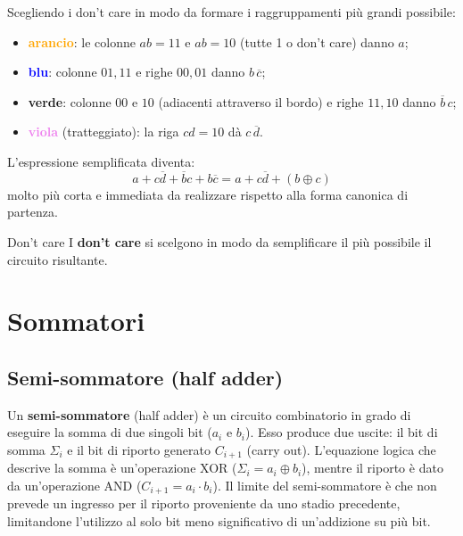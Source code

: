 \noindent Scegliendo i don't care in modo da formare i raggruppamenti più grandi possibile:
\begin{itemize}[leftmargin=1.5em, itemsep=1pt]
    \item \textcolor{orange}{\textbf{arancio}}: le colonne $ab=11$ e $ab=10$ (tutte 1 o don't care) danno $a$;
    \item \textcolor{blue}{\textbf{blu}}: colonne $01,11$ e righe $00,01$ danno $b\,\overline{c}$;
    \item \textcolor{green!60!black}{\textbf{verde}}: colonne $00$ e $10$ (adiacenti attraverso il bordo) e righe $11,10$ danno $\overline{b}\,c$;
    \item \textcolor{violet}{\textbf{viola}} (tratteggiato): la riga $cd=10$ dà $c\,\overline{d}$.
\end{itemize}
L'espressione semplificata diventa:
\[
a+c\overline{d}+\overline{b}c+b\overline{c} = a+c\overline{d}+(b\oplus c)
\]
molto più corta e immediata da realizzare rispetto alla forma canonica di partenza.

\begin{definizione}{Don't care}
I \textbf{don't care} si scelgono in modo da semplificare il più possibile il circuito risultante.
\end{definizione}

\section{Sommatori}

\subsection{Semi-sommatore (half adder)}

\noindent Un \textbf{semi-sommatore} (half adder) è un circuito combinatorio in grado di eseguire la somma di due singoli bit ($a_i$ e $b_i$). Esso produce due uscite: il bit di somma $\Sigma_i$ e il bit di riporto generato $C_{i+1}$ (carry out). L'equazione logica che descrive la somma è un'operazione XOR ($\Sigma_i = a_i \oplus b_i$), mentre il riporto è dato da un'operazione AND ($C_{i+1} = a_i \cdot b_i$). 
Il limite del semi-sommatore è che non prevede un ingresso per il riporto proveniente da uno stadio precedente, limitandone l'utilizzo al solo bit meno significativo di un'addizione su più bit.

